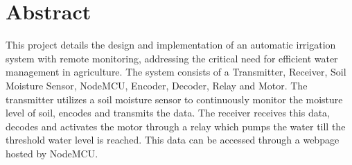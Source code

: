 \chapter*{Abstract}

This project details the design and implementation of an automatic
irrigation system with remote monitoring, addressing the critical
need for efficient water management in agriculture. The system
consists of a Transmitter, Receiver, Soil Moisture Sensor, NodeMCU,
Encoder, Decoder, Relay and Motor. The transmitter utilizes a soil
moisture sensor to continuously monitor the moisture level of soil,
encodes and transmits the data. The receiver receives this data,
decodes and activates the motor through a relay which pumps the water
till the threshold water level is reached. This data can be accessed
through a webpage hosted by NodeMCU.
